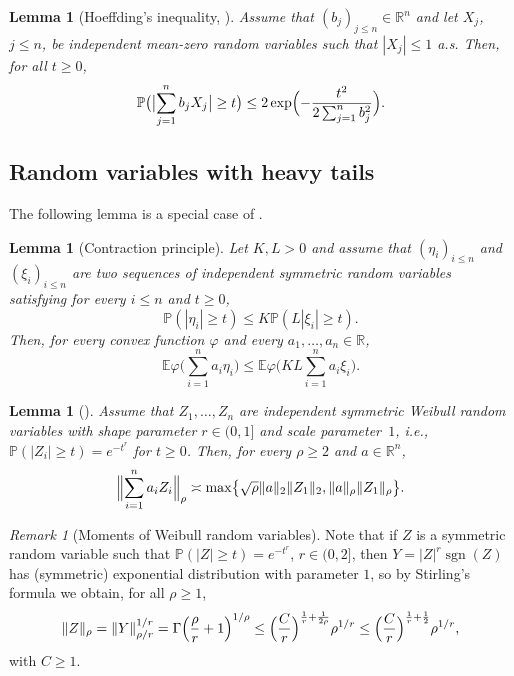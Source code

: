 \documentclass[a4paper]{amsart}
\newtheorem{lemma}[theorem]{Lemma}
\theoremstyle{definition}
\theoremstyle{remark}
\newtheorem{remark}[theorem]{Remark}
\numberwithin{equation}{section}
\newcommand*{\RR}{\mathbb{R}}
\newcommand*{\EE}{\mathbb{E}}
\newcommand*{\PP}{\mathbb{P}}
\newcommand*{\sgn}{\operatorname{sgn}} %
\newcommand*{\prho}{\rho} %
\begin{document}
\begin{lemma}[{Hoeffding's inequality, \cite[Theorem~2]{Hoeffding63}}]
	\label{lem:BGN-1-Hoeffding}
	Assume that $(b_j)_{j\le n}\in\RR^n$
	and let $X_j$, $j\leq n$, be independent mean-zero random variables such that $|X_j|\leq 1$ a.s.
	Then, for all $t\geq 0$,
	\[
	\PP\bigl(\bigl|\sum_{j=1}^n b_j X_j \bigr|\geq t \bigr)
	\leq 2 \exp\Bigl( - \frac{t^2}{2  \sum_{j=1}^n b_j^2 } \Bigr).
	\]
\end{lemma}

%
\subsection{Random variables with heavy tails}
\label{subsec:heavy-tails}
%
The following lemma is a special case of \cite[Theorem~1]{Kwapien87}.
\begin{lemma}[Contraction principle]
	\label{lem:contraction-Kwapien}
	Let $K, L>0$ and assume that $(\eta_i)_{i\le n}$ and $(\xi_i)_{i\le n}$ are two sequences of independent symmetric random variables satisfying for every $i\le n$ and  $t\ge 0$,
	\[
		\PP(|\eta_i| \ge t) \le K \PP(L|\xi_i|\ge t).
	\]
	Then, for every convex function $\varphi$ and every $a_1,\ldots, a_n \in \RR$,
	\[
		\EE\varphi\Big(\sum_{i=1}^n a_i \eta_i\Big)\le \EE\varphi\Big(KL\sum_{i=1}^n a_i\xi_i\Big).
	\]
\end{lemma}

\begin{lemma}[{\cite[Theorem~6.2]{HM-SO}}]
	\label{lem:Weibull-moments}
	Assume that $Z_1, \dots, Z_n$ are independent symmetric Weibull random variables with shape parameter $r\in(0,1]$ and scale parameter~$1$,
	i.e., $\PP(|Z_i|\ge t)=e^{-t^r}$ for $t\geq 0$.
	Then, for every $\prho{}\ge 2$ and $a\in \RR^n$,
	\[
		\Bigl\| \sum_{i=1}^n a_iZ_i \Bigr\|_{\prho{}} \asymp \max\bigl\{ \sqrt{\prho{}} \|a\|_2\|Z_1\|_2 , \|a\|_{\prho{}}\|Z_1\|_{\prho{}} \bigr\}.
	\]
\end{lemma}

\begin{remark}[Moments of Weibull random variables]
	\label{rmk:Weibull-moments}
	Note that if $Z$ is a symmetric random variable such that $\PP(|Z|\ge t)=e^{-t^r}$, $r\in(0,2]$, then $Y=|Z|^{r}\sgn(Z)$ has (symmetric) exponential distribution with parameter $1$, so by Stirling's formula we obtain, for all $\rho \ge 1$,
	\[
		\|Z\|_{\prho{}} = \|Y\|_{\prho{}/r}^{1/r} = \Gamma\Bigl(\frac{\prho{}}r +1\Bigr)^{1/{\prho{}}} \leq  \Bigl(\frac Cr\Bigr)^{\frac 1r + \frac 1{2\prho{}}} \prho{}^{1/r} \le  \Bigl(\frac Cr\Bigr)^{\frac 1r + \frac 1{2}} \prho{}^{1/r} ,
	\]
	with $C\ge 1$.	
	\end{remark}
\end{document}
